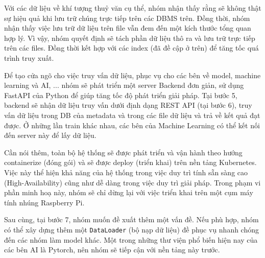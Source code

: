 Với các dữ liệu về khí tượng thuỷ văn cụ thể, nhóm nhận thấy rằng sẽ không thật sự hiệu quả khi lưu trữ chúng trực tiếp trên các DBMS trên. Đồng thời, nhóm nhận thấy việc lưu trữ dữ liệu trên file vẫn đem đến một kích thước tổng quan hợp lý. Vì vậy, nhóm quyết định sẽ tách phần dữ liệu thô ra và lưu trữ trực tiếp trên các files. Đồng thời kết hợp với các index (đã đề cập ở trên) để tăng tốc quá trình truy xuất.

Để tạo cửa ngõ cho việc truy vấn dữ liệu, phục vụ cho các bên về model, machine learning và AI, ... nhóm sẽ phát triển một server Backend đơn giản, sử dụng FastAPI của Python để giúp tăng tốc độ phát triển giải pháp. Tại bước 5, backend sẽ nhận dữ liệu truy vấn dưới định dạng REST API (tại bước 6), truy vấn dữ liệu trong DB của metadata và trong các file dữ liệu và trả về kết quả đạt được. Ở những lần train khác nhau, các bên của Machine Learning có thể kết nối đến server này để lấy dữ liệu.

Cần nói thêm, toàn bộ hệ thống sẽ được phát triển và vận hành theo hướng containerize (đóng gói) và sẽ được deploy (triển khai) trên nền tảng Kubernetes. Việc này thể hiện khả năng của hệ thống trong việc duy trì tính sẵn sàng cao (High-Availability) cũng như dễ dàng trong việc duy trì giải pháp. Trong phạm vi phần minh hoạ này, nhóm sẽ chỉ dừng lại với việc triển khai trên một cụm máy tính nhúng Raspberry Pi.

Sau cùng, tại bước 7, nhóm muốn đề xuất thêm một vấn đề. Nếu phù hợp, nhóm có thể xây dựng thêm một \texttt{DataLoader} (bộ nạp dữ liệu) đề phục vụ nhanh chóng đến các nhóm làm model khác. Một trong những thư viện phổ biến hiện nay của các bên AI là Pytorch, nên nhóm sẽ tiếp cận với nền tảng này trước.